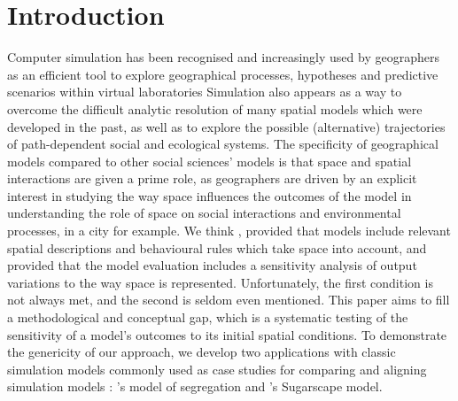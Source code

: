 \documentclass[preprint,5p,times,twocolumn,authoryear]{elsarticle}
\begin{document}
%









\section{Introduction}

Computer simulation has been recognised and increasingly used by geographers as an efficient tool to explore geographical processes, hypotheses and predictive scenarios within virtual laboratories \citep{batty1971modelling, batty2007model, carley1999generating, Quesneletal2009} Simulation also appears as a way to overcome the difficult analytic resolution of many spatial models which were developed in the past, as well as to explore the possible (alternative) trajectories of path-dependent social and ecological systems. The specificity of geographical models compared to other social sciences' models is that space and spatial interactions are given a prime role, as geographers are driven by an explicit interest in studying the way space influences the outcomes of the model in understanding the role of space on social interactions and environmental processes, in a city for example. We think , provided that models include relevant spatial descriptions and behavioural rules which take space into account, and provided that the model evaluation includes a sensitivity analysis of output variations to the way space is represented. Unfortunately, the first condition is not always met, and the second is seldom even mentioned. This paper aims to fill a methodological and conceptual gap, which is a systematic testing of the sensitivity of a model's outcomes to its initial spatial conditions. To demonstrate the genericity of our approach, we develop two applications with classic simulation models commonly used as case studies for comparing and aligning simulation models \citep{Axtelletal1996, wilensky2007making}: \citet{schelling1971dynamic}'s model of segregation and \citet{EpsteinAxtell1996}'s Sugarscape model.\\
\end{document}
